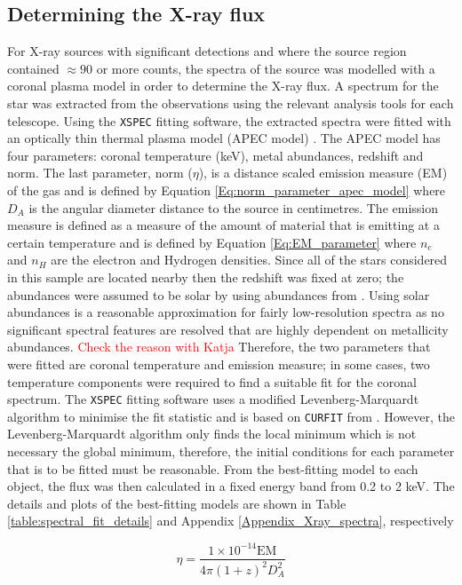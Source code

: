 \subsection{Determining the X-ray flux}
\label{Section_Determining_Xray_flux}
For X-ray sources with significant detections and where the source region contained $\approx 90$ or more counts, the spectra of the source was modelled with a coronal plasma model in order to determine the X-ray flux. A spectrum for the star was extracted from the observations using the relevant analysis tools for each telescope. Using the \texttt{XSPEC} fitting software, the extracted spectra were fitted with an optically thin thermal plasma model (APEC model) . The APEC model has four parameters: coronal temperature (keV), metal abundances, redshift and norm. The last parameter, norm ($\eta$), is a distance scaled emission measure (EM) of the gas and is defined by Equation \ref{Eq:norm_parameter_apec_model} where $D_{A}$ is the angular diameter distance to the source in centimetres. The emission measure is defined as a measure of the amount of material that is emitting at a certain temperature and is defined by Equation \ref{Eq:EM_parameter} where $n_{e}$ and $n_{H}$ are the electron and Hydrogen densities. Since all of the stars considered in this sample are located nearby then the redshift was fixed at zero; the abundances were assumed to be solar by using abundances from \citet{Grevesse_Sauval_1998}. Using solar abundances is a reasonable approximation for fairly low-resolution spectra as no significant spectral features are resolved that are highly dependent on metallicity abundances. \textcolor{red}{Check the reason with Katja}
Therefore, the two parameters that were fitted are coronal temperature and emission measure; in some cases, two temperature components were required to find a suitable fit for the coronal spectrum. The \texttt{XSPEC} fitting software uses a modified Levenberg-Marquardt algorithm to minimise the fit statistic and is based on \texttt{CURFIT} from \citet{Bevington_1969}. However, the Levenberg-Marquardt algorithm only finds the local minimum which is not necessary the global minimum, therefore, the initial conditions for each parameter that is to be fitted must be reasonable. From the best-fitting model to each object, the flux was then calculated in a fixed energy band from 0.2 to 2 keV. The details and plots of the best-fitting models are shown in Table \ref{table:spectral_fit_details} and Appendix \ref{Appendix_Xray_spectra}, respectively

\begin{equation}
    \eta = \frac{1 \times 10^{-14} \text{EM}}{4\pi(1+z)^{2}D_{A}^{2}}
    \label{Eq:norm_parameter_apec_model}
\end{equation}

